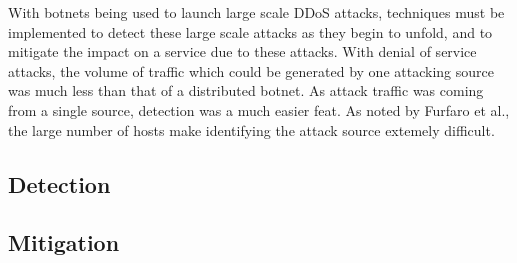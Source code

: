 With botnets being used to launch large scale DDoS attacks, techniques must be
implemented to detect these large scale attacks as they begin to unfold, and to
mitigate the impact on a service due to these attacks. With denial of service
attacks, the volume of traffic which could be generated by one attacking source
was much less than that of a distributed botnet. As attack traffic was coming
from a single source, detection was a much easier feat. As noted by Furfaro et
al.\cite{furfaro}, the large number of hosts make identifying the attack source
extemely difficult.

\subsection{Detection}



\subsection{Mitigation}


